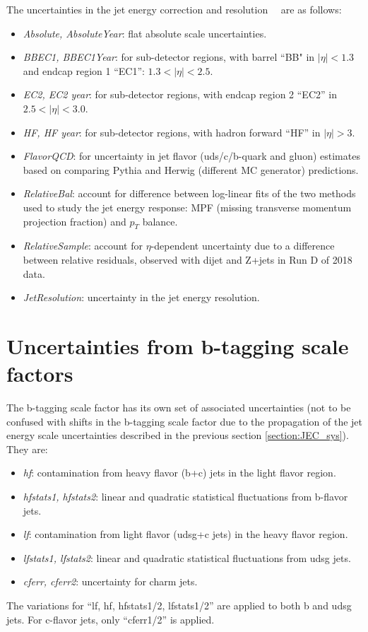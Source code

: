 The uncertainties in the jet energy correction and resolution~\cite{CMS-JME-13-004}~\cite{twiki_JetEnergyScale_Uncertainty_Sources_JERC} are as follows:
    \begin{itemize}
        \item \textit{Absolute, AbsoluteYear}: flat absolute scale uncertainties.
        \item \textit{BBEC1, BBEC1Year}: for sub-detector regions, with barrel ``BB" in $|\eta| < 1.3$ and endcap region 1 ``EC1'': $1.3 < |\eta| < 2.5$.
        \item \textit{EC2, EC2 year}: for sub-detector regions, with endcap region 2 ``EC2'' in $2.5 < |\eta| < 3.0$.
        \item \textit{HF, HF year}: for sub-detector regions, with hadron forward ``HF'' in $|\eta| > 3$.
        \item \textit{FlavorQCD}: for uncertainty in jet flavor (uds/c/b-quark and gluon) estimates based on comparing Pythia and Herwig (different MC generator) predictions. 
        \item \textit{RelativeBal}: account for difference between log-linear fits of the two methods used to study the jet energy response: MPF (missing transverse momentum projection fraction) and $p_{T}$ balance.
        \item \textit{RelativeSample}: account for $\eta$-dependent uncertainty due to a difference between relative residuals, observed with dijet and Z+jets in Run D of 2018 data.
        \item \textit{JetResolution}: uncertainty in the jet energy resolution.
    \end{itemize}

\section{Uncertainties from b-tagging scale factors}
The b-tagging scale factor has its own set of associated uncertainties (not to be confused with shifts in the b-tagging scale factor due to the propagation of the jet energy scale uncertainties described in the previous section \ref{section:JEC_sys}). They are:
\begin{itemize}
    \item \textit{hf}: contamination from heavy flavor (b+c) jets in the light flavor region.
    \item \textit{hfstats1, hfstats2}: linear and quadratic statistical fluctuations from b-flavor jets. 
    \item \textit{lf}: contamination from light flavor (udsg+c jets) in the heavy flavor region.
    \item \textit{lfstats1, lfstats2}: linear and quadratic statistical fluctuations from udsg jets.
    \item \textit{cferr, cferr2}: uncertainty for charm jets.
\end{itemize}
The variations for ``lf, hf, hfstats1/2, lfstats1/2'' are applied to both b and udsg jets. For c-flavor jets, only ``cferr1/2'' is applied.

